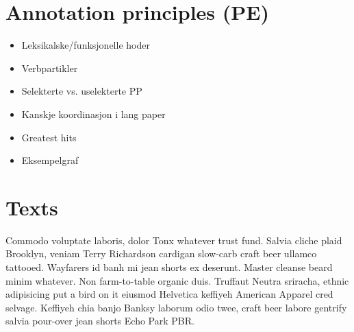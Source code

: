 \documentclass[11pt,a4paper]{article}
\begin{document}
\section{Annotation principles (PE)}
\begin{itemize}
    \item Leksikalske/funksjonelle hoder
    \item Verbpartikler
    \item Selekterte vs. uselekterte PP
    \item Kanskje koordinasjon i lang paper 
    \item Greatest hits
    \item Eksempelgraf
\end{itemize}

\section{Texts}


Commodo voluptate laboris, dolor Tonx whatever trust fund. Salvia cliche plaid
Brooklyn, veniam Terry Richardson cardigan slow-carb craft beer ullamco
tattooed. Wayfarers id banh mi jean shorts ex deserunt. Master cleanse beard
minim whatever. Non farm-to-table organic duis. Truffaut Neutra sriracha,
ethnic adipisicing put a bird on it eiusmod Helvetica keffiyeh American
Apparel cred selvage. Keffiyeh chia banjo Banksy laborum odio twee, craft beer
labore gentrify salvia pour-over jean shorts Echo Park PBR.
\end{document}
